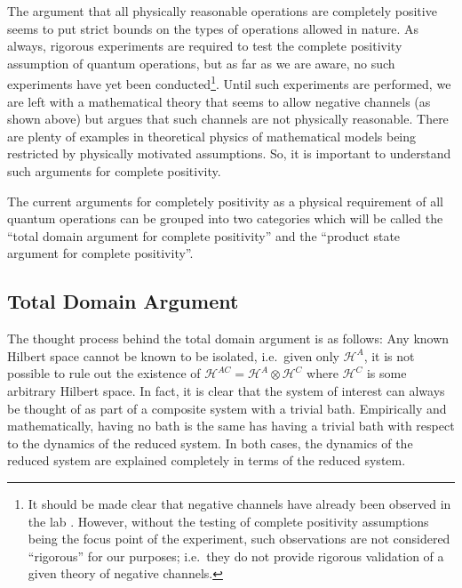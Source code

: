 The argument that all physically reasonable operations are completely positive seems to put strict bounds on the types of operations allowed in nature.  As always, rigorous experiments are required to test the complete positivity assumption of quantum operations, but as far as we are aware, no such experiments have yet been conducted\footnote{It should be made clear that negative channels have already been observed in the lab \cite{MAJORPAPERFROMCORYREF}.  However, without the testing of complete positivity assumptions being the focus point of the experiment, such observations are not considered ``rigorous'' for our purposes; i.e.\ they do not provide rigorous validation of a given theory of negative channels.}.  Until such experiments are performed, we are left with a mathematical theory that seems to allow negative channels (as shown above) but argues that such channels are not physically reasonable.  There are plenty of examples in theoretical physics of mathematical models being restricted by physically motivated assumptions.  So, it is important to understand such arguments for complete positivity.

The current arguments for completely positivity as a physical requirement of all quantum operations can be grouped into two categories which will be called the ``total domain argument for complete positivity'' and the ``product state argument for complete positivity''.

\subsection{Total Domain Argument}

The thought process behind the total domain argument is as follows: Any known Hilbert space cannot be known to be isolated, i.e.\ given only $\mathcal{H}^A$, it is not possible to rule out the existence of $\mathcal{H}^{AC} = \mathcal{H}^A \otimes \mathcal{H}^C$ where $\mathcal{H}^C$ is some arbitrary Hilbert space.  In fact, it is clear that the system of interest can always be thought of as part of a composite system with a trivial bath.  Empirically and mathematically, having no bath is the same has having a trivial bath with respect to the dynamics of the reduced system.  In both cases, the dynamics of the reduced system are explained completely in terms of the reduced system.

